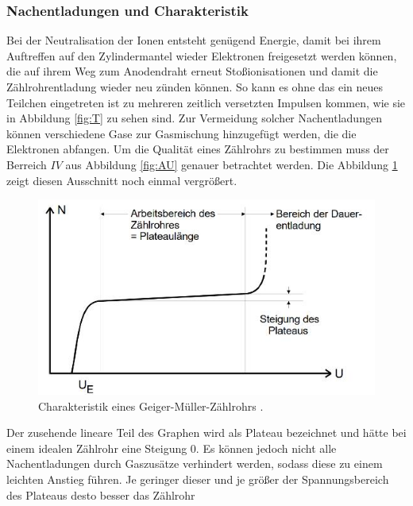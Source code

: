 \subsubsection{Nachentladungen und Charakteristik}
Bei der Neutralisation der Ionen entsteht genügend Energie, damit bei ihrem Auftreffen auf den Zylindermantel wieder Elektronen freigesetzt werden können, die auf ihrem Weg zum Anodendraht erneut Stoßionisationen  und damit die Zählrohrentladung wieder neu zünden können.
So kann es ohne das ein neues Teilchen eingetreten ist zu mehreren zeitlich versetzten Impulsen kommen, wie sie in Abbildung \ref{fig:T} zu sehen sind. Zur Vermeidung solcher Nachentladungen können verschiedene Gase zur Gasmischung hinzugefügt werden, die die Elektronen abfangen.\newline
Um die Qualität eines Zählrohrs zu bestimmen muss der Berreich $IV$ aus Abbildung \ref{fig:AU} genauer betrachtet werden. Die Abbildung \ref{fig:AU2} zeigt diesen Ausschnitt noch einmal vergrößert.
\begin{figure}
\centering
\includegraphics[scale=0.5]{content/images/AU2.jpg}
\caption{Charakteristik eines Geiger-Müller-Zählrohrs \cite{V703}.}
\label{fig:AU2}
\end{figure}
Der zusehende lineare Teil des Graphen wird als Plateau bezeichnet und hätte bei einem idealen Zählrohr eine Steigung 0.
Es können jedoch nicht alle Nachentladungen durch Gaszusätze verhindert werden, sodass diese zu einem leichten Anstieg führen.
Je geringer dieser und je größer der Spannungsbereich des Plateaus desto besser das Zählrohr
